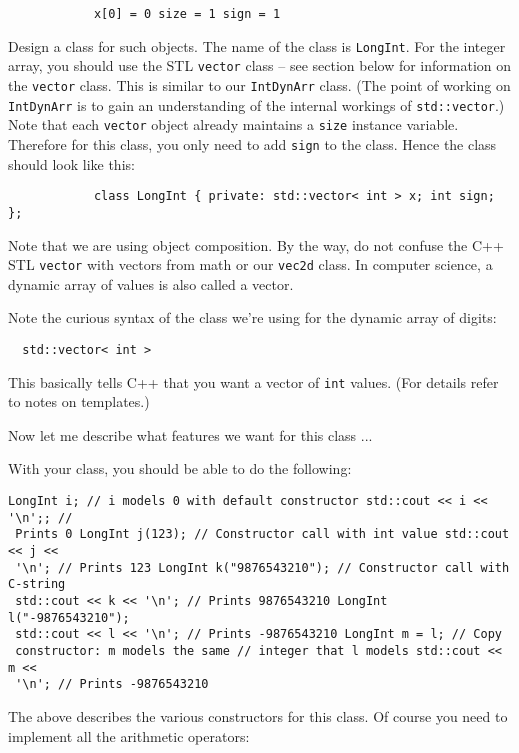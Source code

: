 \begin{Verbatim}
            x[0] = 0 size = 1 sign = 1
\end{Verbatim}

Design a class for such objects. The name of the class is \verb!LongInt!.  For
the integer array, you should use the STL \verb!vector! class – see section
below for information on the \verb!vector! class. This is similar to our
\verb!IntDynArr! class. (The point of working on \verb!IntDynArr!  is to gain
an understanding of the internal workings of \verb!std::vector!.)  Note that
each \verb!vector! object already maintains a \verb!size! instance
variable. Therefore for this class, you only need to add \verb!sign! to the
class. Hence the class should look like this:

\begin{Verbatim}
            class LongInt { private: std::vector< int > x; int sign; };
\end{Verbatim}

Note that we are using object composition. By the way, do not confuse the C++
STL \verb!vector! with vectors from math or our \verb!vec2d! class.  In
computer science, a dynamic array of values is also called a vector.

Note the curious syntax of the class we're using for the dynamic array of
digits:

\verb!  std::vector< int >!

This basically tells C++ that you want a vector of \verb!int! values.  (For
details refer to notes on templates.)

Now let me describe what features we want for this class ...

With your class, you should be able to do the following:

\begin{Verbatim}[frame=single,fontsize=\footnotesize]
LongInt i; // i models 0 with default constructor std::cout << i << '\n';; //
 Prints 0 LongInt j(123); // Constructor call with int value std::cout << j <<
 '\n'; // Prints 123 LongInt k("9876543210"); // Constructor call with C-string
 std::cout << k << '\n'; // Prints 9876543210 LongInt l("-9876543210");
 std::cout << l << '\n'; // Prints -9876543210 LongInt m = l; // Copy
 constructor: m models the same // integer that l models std::cout << m <<
 '\n'; // Prints -9876543210
\end{Verbatim}

The above describes the various constructors for this class. Of course you need
to implement all the arithmetic operators:

